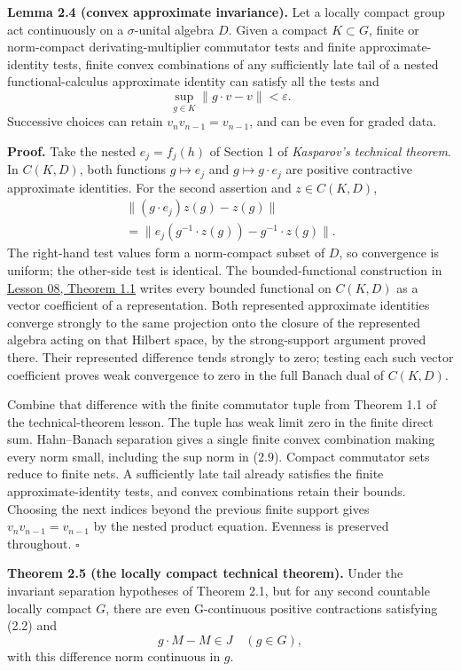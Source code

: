 \documentclass[
  11pt,
]{article}
\begin{document}
\textbf{Lemma 2.4 (convex approximate invariance).} Let a locally
compact group act continuously on a \(\sigma\)-unital algebra \(D\).
Given a compact \(K\subset G\), finite or norm-compact
derivating-multiplier commutator tests and finite approximate-identity
tests, finite convex combinations of any sufficiently late tail of a
nested functional-calculus approximate identity can satisfy all the
tests and \[
\sup_{g\in K}\|g\cdot v-v\|<\varepsilon.
\tag{2.9}
\] Successive choices can retain \(v_nv_{n-1}=v_{n-1}\), and can be even
for graded data.

\textbf{Proof.} Take the nested \(e_j=f_j(h)\) of Section 1 of
\emph{Kasparov's technical theorem}. In \(C(K,D)\), both functions
\(g\mapsto e_j\) and \(g\mapsto g\cdot e_j\) are positive contractive
approximate identities. For the second assertion and \(z\in C(K,D)\), \[
\begin{gathered}
\|(g\cdot e_j)z(g)-z(g)\|\\
=\|e_j(g^{-1}\cdot z(g))-g^{-1}\cdot z(g)\|.
\end{gathered}
\tag{2.10}
\] The right-hand test values form a norm-compact subset of \(D\), so
convergence is uniform; the other-side test is identical. The
bounded-functional construction in
\href{KT-KK-08.html\#1-approximate-identities-with-commutator-control}{Lesson
08, Theorem 1.1} writes every bounded functional on \(C(K,D)\) as a
vector coefficient of a representation. Both represented approximate
identities converge strongly to the same projection onto the closure of
the represented algebra acting on that Hilbert space, by the
strong-support argument proved there. Their represented difference tends
strongly to zero; testing each such vector coefficient proves weak
convergence to zero in the full Banach dual of \(C(K,D)\).

Combine that difference with the finite commutator tuple from Theorem
1.1 of the technical-theorem lesson. The tuple has weak limit zero in
the finite direct sum. Hahn--Banach separation gives a single finite
convex combination making every norm small, including the sup norm in
(2.9). Compact commutator sets reduce to finite nets. A sufficiently
late tail already satisfies the finite approximate-identity tests, and
convex combinations retain their bounds. Choosing the next indices
beyond the previous finite support gives \(v_nv_{n-1}=v_{n-1}\) by the
nested product equation. Evenness is preserved throughout. \(\square\)

\textbf{Theorem 2.5 (the locally compact technical theorem).} Under the
invariant separation hypotheses of Theorem 2.1, but for any second
countable locally compact \(G\), there are even G-continuous positive
contractions satisfying (2.2) and \[
g\cdot M-M\in J\quad(g\in G),
\tag{2.11}
\] with this difference norm continuous in \(g\).
\end{document}
